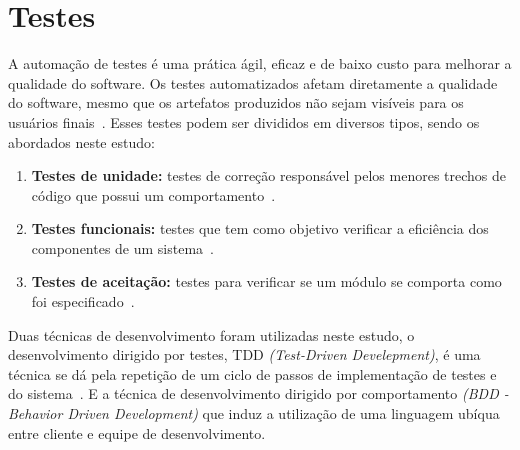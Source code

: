 \section{Testes}
\label{sec:testes}

A automação de testes é uma prática ágil, eficaz e de baixo custo para melhorar
a qualidade do software.
%
Os testes automatizados afetam diretamente a qualidade do software, mesmo que os artefatos  produzidos não sejam visíveis para os usuários finais~\cite{bernardo2011}.
Esses testes podem ser divididos em diversos tipos, sendo os abordados neste estudo:

\begin{enumerate}

\item \textbf{Testes de unidade:} testes de correção responsável pelos
menores trechos de código que possui um comportamento~\cite{bernardo2011}.

\item \textbf{Testes funcionais:} testes que tem como objetivo verificar a eficiência
dos componentes de um sistema~\cite{molinari2003}.

\item \textbf{Testes de aceitação:} testes para verificar se um módulo se comporta como foi especificado~\cite{martin2005}.

\end{enumerate}

Duas técnicas de desenvolvimento foram utilizadas neste estudo, o desenvolvimento dirigido por testes, TDD \textit{(Test-Driven Develepment)}, é uma técnica se dá pela repetição de um ciclo de passos de implementação de testes e do sistema~\cite{koskela2007}.
%
E a técnica de desenvolvimento dirigido por comportamento \textit{(BDD - Behavior Driven Development)} que induz a utilização de uma linguagem ubíqua entre cliente e equipe de desenvolvimento. 

